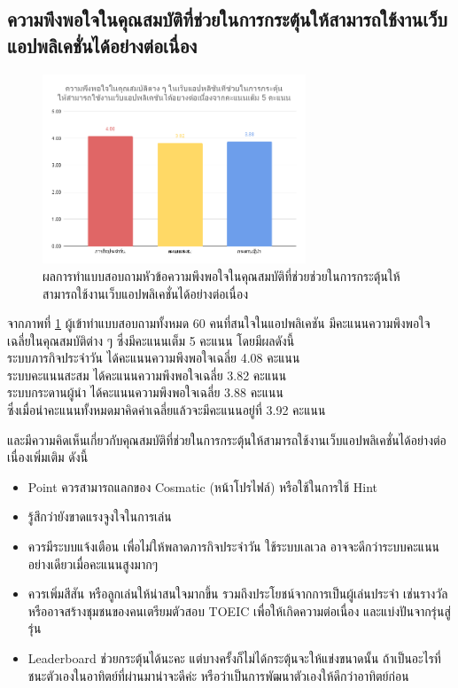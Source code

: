 \documentclass[12pt,oneside,openright,a4paper]{cpe-thai-project}
\begin{document}
\pagebreak
\subsection{ความพึงพอใจในคุณสมบัติที่ช่วยในการกระตุ้นให้สามารถใช้งานเว็บแอปพลิเคชั่นได้อย่างต่อเนื่อง}
\begin{figure}[!h]\centering
	\includegraphics[width=0.7\textwidth, keepaspectratio=true]{image/appendix/2nd/addict.png}
	\caption{{ผลการทำแบบสอบถามหัวข้อความพึงพอใจในคุณสมบัติที่ช่วยช่วยในการกระตุ้นให้สามารถใช้งานเว็บแอปพลิเคชั่นได้อย่างต่อเนื่อง}}\label{fig:apdx2ndAddict}
\end{figure}

\hspace{1cm}
จากภาพที่ \ref{fig:apdx2ndAddict} ผู้เข้าทำแบบสอบถามทั้งหมด 60 คนที่สนใจในแอปพลิเคชัน
มีคะแนนความพึงพอใจเฉลี่ยในคุณสมบัติต่าง ๆ ซึ่งมีคะแนนเต็ม 5 คะแนน โดยมีผลดังนี้
\\ระบบภารกิจประจำวัน ได้คะแนนความพึงพอใจเฉลี่ย 4.08 คะแนน
\\ระบบคะแนนสะสม ได้คะแนนความพึงพอใจเฉลี่ย 3.82 คะแนน
\\ระบบกระดานผู้นำ ได้คะแนนความพึงพอใจเฉลี่ย 3.88 คะแนน
\\ซึ่งเมื่อนำคะแนนทั้งหมดมาคิดค่าเฉลี่ยแล้วจะมีคะแนนอยู่ที่ 3.92 คะแนน

และมีความคิดเห็นเกี่ยวกับคุณสมบัติที่ช่วยในการกระตุ้นให้สามารถใช้งานเว็บแอปพลิเคชั่นได้อย่างต่อเนื่องเพิ่มเติม ดังนี้
\begin{itemize}
	\item Point ควรสามารถแลกของ Cosmatic (หน้าโปรไฟล์) หรือใช้ในการใช้ Hint
	\item รู้สึกว่ายังขาดแรงจูงใจในการเล่น
	\item ควรมีระบบแจ้งเตือน เพื่อไม่ให้พลาดภารกิจประจำวัน ใช้ระบบเลเวล อาจจะดีกว่าระบบคะแนนอย่างเดียวเมื่อคะแนนสูงมากๆ
	\item ควรเพิ่มสีสัน หรือลูกเล่นให้น่าสนใจมากขึ้น รวมถึงประโยชน์จากการเป็นผู้เล่นประจำ เช่นรางวัล หรืออาจสร้างชุมชนของคนเตรียมตัวสอบ TOEIC เพื่อให้เกิดความต่อเนื่อง และแบ่งปันจากรุ่นสู่รุ่น
	\item Leaderboard ช่วยกระตุ้นได้นะคะ แต่บางครั้งก็ไม่ได้กระตุ้นจะให้แข่งขนาดนั้น ถ้าเป็นอะไรที่ชนะตัวเองในอาทิตย์ที่ผ่านมาน่าจะดีค่ะ หรือว่าเป็นการพัฒนาตัวเองให้ดีกว่าอาทิตย์ก่อน
\end{itemize}
\end{document}

